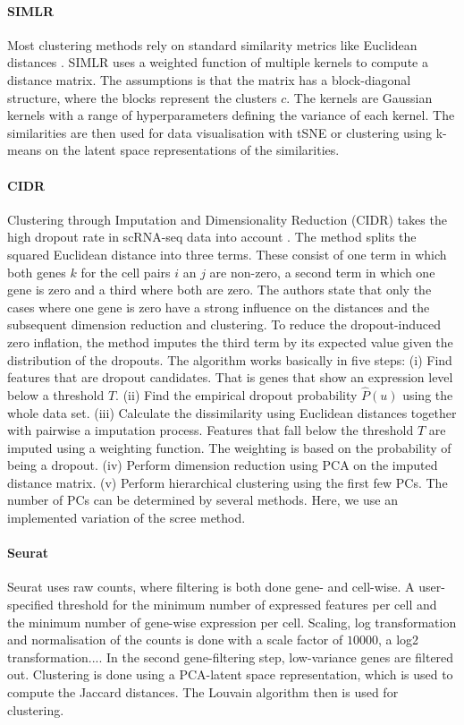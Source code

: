 \documentclass[11pt, a4paper]{article}\usepackage[]{graphicx}\usepackage[]{color}
\begin{document}
\paragraph{SIMLR}
Most clustering methods rely on standard similarity metrics like Euclidean distances \citep{wang2017visualization}. SIMLR uses a weighted function of multiple kernels to compute a distance matrix. The assumptions is that the matrix has a block-diagonal structure, where the blocks represent the clusters $c$. The kernels are Gaussian kernels with a range of hyperparameters defining the variance of each kernel. The similarities are then used for data visualisation with tSNE or clustering using k-means on the latent space representations of the similarities.

\paragraph{CIDR}
Clustering through Imputation and Dimensionality Reduction (CIDR) takes the high dropout rate in scRNA-seq data into account \citep{lin2017cidr}. The method splits the squared Euclidean distance into three terms. These consist of one term in which both genes $k$ for the cell pairs $i$ an $j$ are non-zero, a second term in which one gene is zero and a third where both are zero. The authors state that only the cases where one gene is zero have a strong influence on the distances and the subsequent dimension reduction and clustering. To reduce the dropout-induced zero inflation, the method imputes the third term by its expected value given the distribution of the dropouts. 
The algorithm works basically in five steps: (i) Find features that are dropout candidates. That is genes that show an expression level below a threshold $T$. (ii) Find the empirical dropout probability $\hat P(u)$ using the whole data set. (iii) Calculate the dissimilarity using Euclidean distances together with pairwise a imputation process. Features that fall below the threshold $T$ are imputed using a weighting function. The weighting is based on the probability of being a dropout. (iv) Perform dimension reduction using PCA on the imputed distance matrix. (v) Perform hierarchical clustering using the first few PCs. The number of PCs can be determined by several methods. Here, we use an implemented variation of the scree method. 
\paragraph{Seurat}
Seurat uses raw counts, where filtering is both done gene- and cell-wise. A user-specified threshold for the minimum number of expressed features per cell and the minimum number of gene-wise expression per cell. Scaling, log transformation and normalisation of the counts is done with a scale factor of $10000$, a log2 transformation.... In the second gene-filtering step, low-variance genes are filtered out. 
Clustering is done using a PCA-latent space representation, which is used to compute the Jaccard distances. The Louvain algorithm then is used for clustering.
\end{document}
